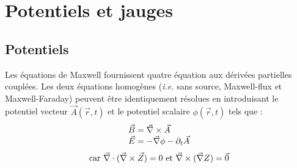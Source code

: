 \section{Potentiels et jauges}
\subsection{Potentiels}
	Les équations de Maxwell fournissent quatre équation aux dérivées partielles couplées. Les deux équations homogènes ({\it i.e.} sans source, Maxwell-flux et Maxwell-Faraday) peuvent être identiquement résolues en introduisant le potentiel vecteur $\vec{A}(\vec{r},t)$ et le potentiel scalaire $\phi(\vec{r},t)$ tels que :
$$
	\begin{array}{r@{\;}l}
		\vec{B}&=\nab\times\vec{A}\\
		\vec{E}&=-\nab\phi-\partial_t\vec{A}
	\end{array}
$$
$$
	\text{car } \vec{\nabla}\cdot(\vec{\nabla}\times\vec{Z})=0
	\text{ et }\vec{\nabla}\times(\vec{\nabla} Z)=\vec{0}
$$

